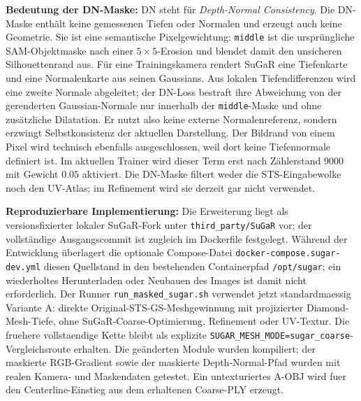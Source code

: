 \documentclass[12pt,a4paper]{article}
\begin{document}
\textbf{Bedeutung der DN-Maske:} DN steht für \emph{Depth-Normal Consistency}. Die DN-Maske enthält keine gemessenen Tiefen oder Normalen und erzeugt auch keine Geometrie. Sie ist eine semantische Pixelgewichtung: \texttt{middle} ist die ursprüngliche SAM-Objektmaske nach einer $5 \times 5$-Erosion und blendet damit den unsicheren Silhouettenrand aus. Für eine Trainingskamera rendert SuGaR eine Tiefenkarte und eine Normalenkarte aus seinen Gaussians. Aus lokalen Tiefendifferenzen wird eine zweite Normale abgeleitet; der DN-Loss bestraft ihre Abweichung von der gerenderten Gaussian-Normale nur innerhalb der \texttt{middle}-Maske und ohne zusätzliche Dilatation. Er nutzt also keine externe Normalenreferenz, sondern erzwingt Selbstkonsistenz der aktuellen Darstellung. Der Bildrand von einem Pixel wird technisch ebenfalls ausgeschlossen, weil dort keine Tiefennormale definiert ist. Im aktuellen Trainer wird dieser Term erst nach Zählerstand $9000$ mit Gewicht $0.05$ aktiviert. Die DN-Maske filtert weder die STS-Eingabewolke noch den UV-Atlas; im Refinement wird sie derzeit gar nicht verwendet.

\textbf{Reproduzierbare Implementierung:} Die Erweiterung liegt als versionsfixierter lokaler SuGaR-Fork unter \texttt{third\_party/SuGaR} vor; der vollständige Ausgangscommit ist zugleich im Dockerfile festgelegt. Während der Entwicklung überlagert die optionale Compose-Datei \texttt{docker-compose.sugar-dev.yml} diesen Quellstand in den bestehenden Containerpfad \texttt{/opt/sugar}; ein wiederholtes Herunterladen oder Neubauen des Images ist damit nicht erforderlich. Der Runner \texttt{run\_masked\_sugar.sh} verwendet jetzt standardmaessig Variante A: direkte Original-STS-GS-Meshgewinnung mit projizierter Diamond-Mesh-Tiefe, ohne SuGaR-Coarse-Optimierung, Refinement oder UV-Textur. Die fruehere vollstaendige Kette bleibt als explizite \texttt{SUGAR\_MESH\_MODE=sugar\_coarse}-Vergleichsroute erhalten. Die geänderten Module wurden kompiliert; der maskierte RGB-Gradient sowie der maskierte Depth-Normal-Pfad wurden mit realen Kamera- und Maskendaten getestet. Ein untexturiertes A-OBJ wird fuer den Centerline-Einstieg aus dem erhaltenen Coarse-PLY erzeugt.
\end{document}

